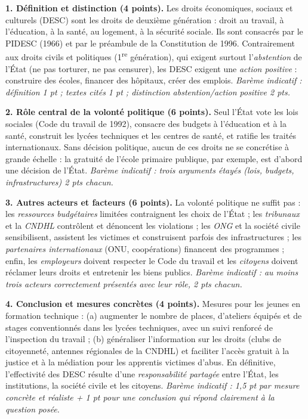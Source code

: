\documentclass[11pt]{article}
\begin{document}
\begin{corrige}
\textbf{1. Définition et distinction (4 points).} Les droits économiques, sociaux et culturels (DESC) sont les droits de deuxième génération : droit au travail, à l'éducation, à la santé, au logement, à la sécurité sociale. Ils sont consacrés par le PIDESC (1966) et par le préambule de la Constitution de 1996. Contrairement aux droits civils et politiques (1\textsuperscript{re} génération), qui exigent surtout l'\emph{abstention} de l'État (ne pas torturer, ne pas censurer), les DESC exigent une \emph{action positive} : construire des écoles, financer des hôpitaux, créer des emplois. \emph{Barème indicatif : définition 1 pt ; textes cités 1 pt ; distinction abstention/action positive 2 pts.}

\textbf{2. Rôle central de la volonté politique (6 points).} Seul l'État vote les lois sociales (Code du travail de 1992), consacre des budgets à l'éducation et à la santé, construit les lycées techniques et les centres de santé, et ratifie les traités internationaux. Sans décision politique, aucun de ces droits ne se concrétise à grande échelle : la gratuité de l'école primaire publique, par exemple, est d'abord une décision de l'État. \emph{Barème indicatif : trois arguments étayés (lois, budgets, infrastructures) 2 pts chacun.}

\textbf{3. Autres acteurs et facteurs (6 points).} La volonté politique ne suffit pas : les \emph{ressources budgétaires} limitées contraignent les choix de l'État ; les \emph{tribunaux} et la \emph{CNDHL} contrôlent et dénoncent les violations ; les \emph{ONG} et la société civile sensibilisent, assistent les victimes et construisent parfois des infrastructures ; les \emph{partenaires internationaux} (ONU, coopérations) financent des programmes ; enfin, les \emph{employeurs} doivent respecter le Code du travail et les \emph{citoyens} doivent réclamer leurs droits et entretenir les biens publics. \emph{Barème indicatif : au moins trois acteurs correctement présentés avec leur rôle, 2 pts chacun.}

\textbf{4. Conclusion et mesures concrètes (4 points).} Mesures pour les jeunes en formation technique : (a) augmenter le nombre de places, d'ateliers équipés et de stages conventionnés dans les lycées techniques, avec un suivi renforcé de l'inspection du travail ; (b) généraliser l'information sur les droits (clubs de citoyenneté, antennes régionales de la CNDHL) et faciliter l'accès gratuit à la justice et à la médiation pour les apprentis victimes d'abus. En définitive, l'effectivité des DESC résulte d'une \emph{responsabilité partagée} entre l'État, les institutions, la société civile et les citoyens. \emph{Barème indicatif : 1,5 pt par mesure concrète et réaliste + 1 pt pour une conclusion qui répond clairement à la question posée.}


\end{corrige}
\end{document}
